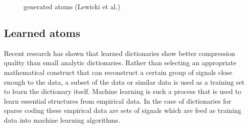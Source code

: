 \begin{figure}
\centering
{}
\hspace{5mm}
\hspace{5mm}
\caption{generated atoms (Lewicki et al.\cite{Lewicki1999})}
\label{fig:generated_atoms}
\end{figure}

\subsection{Learned atoms}
Recent research\cite{Chen1998,Aharon2006,Mairal2010} has shown that learned
dictionaries show better compression quality than small analytic
dictionaries. Rather than selecting an appropriate mathematical construct that
can reconstruct a certain group of signals close enough to the data, a subset of
the data or similar data is used as a training set to learn the dictionary
itself.
Machine learning is such a process that is used to learn essential structures
from empirical data. In the case of dictionaries for sparse coding these
empirical data are sets of signals which are feed as training data into machine
learning algorithms.

